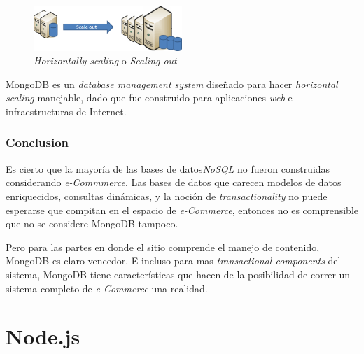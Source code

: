 \begin{figure}[h!]
	\centering
	\includegraphics[width=0.5\textwidth]{figuras/cap2/scale_out.png}
	\caption{\textit{Horizontally scaling} o \textit{Scaling out} }
	\label{figure:figure_scale_out}
\end{figure}

MongoDB es un \textit{database management system} diseñado para hacer \textit{horizontal scaling} manejable, dado que fue construido para aplicaciones \textit{web} e infraestructuras de Internet.

\subsubsection{Conclusion}

Es cierto que la mayoría de las bases de datos\textit{NoSQL} no fueron construidas considerando \textit{e-Commmerce}. Las bases de datos que carecen modelos de datos enriquecidos, consultas dinámicas, y la noción de \textit{transactionality} no puede esperarse que compitan en el espacio de \textit{e-Commerce}, entonces no es comprensible que no se considere MongoDB tampoco.

Pero para las partes en donde el sitio \textit{} comprende el manejo de contenido, MongoDB es claro vencedor. E incluso para mas \textit{transactional components} del sistema, MongoDB tiene características que hacen de la posibilidad de correr un sistema completo de \textit{e-Commerce} una realidad.


\section{Node.js}


